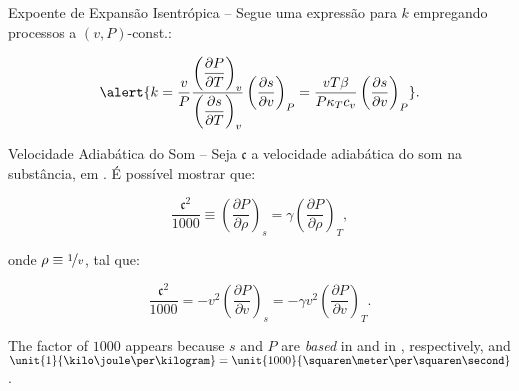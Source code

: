 \begin{frame}[allowframebreaks]{Expoente de Expansão Isentrópica --}
        \pagebreak
        Segue uma expressão para \alert{$k$} empregando processos a \alert{$(v, P)$-const.}:

        \begin{equation*}
            \alert{
                k =
                    \frac{v}{P}
                    \frac{
                        \left(\dfrac{\partial P}{\partial T}\right)_{v}
                    }{
                        \left(\dfrac{\partial s}{\partial T}\right)_{v}
                    }
                    \left(\frac{\partial s}{\partial v}\right)_{P} =
                    \frac{vT\beta}{P\kappa_Tc_v}
                    \left(\frac{\partial s}{\partial v}\right)_{P}
            }.
        \end{equation*}

    \end{frame}

    \begin{frame}[allowframebreaks]{Velocidade Adiabática do Som --}\vspace*{-0em}
        Seja \alert{$\mathfrak{c}$} a velocidade adiabática do som na substância, em
        \meter\per\second. É possível mostrar que:

        \begin{equation*}
            \frac{\mathfrak{c}^2}{1000} \equiv
            \left(\frac{\partial P}{\partial\rho}\right)_s =
            \gamma\left(\frac{\partial P}{\partial\rho}\right)_T,
        \end{equation*}

        \noindent onde $\rho \equiv \nicefrac{1}{v}$, tal que:

        \begin{equation*}
            \frac{\mathfrak{c}^2}{1000} =
            -v^2 \left(\frac{\partial P}{\partial v}\right)_s =
            -\gamma v^2 \left(\frac{\partial P}{\partial v}\right)_T.
        \end{equation*}

        The  factor  of   $1000$   appears   because   $s$   and   $P$   are   {\em   based}   in   {\kilo\joule}   and   in   {\kilo\pascal},   respectively,   and
        $\unit{1}{\kilo\joule\per\kilogram} = \unit{1000}{\squaren\meter\per\squaren\second}$.

    \end{frame}


